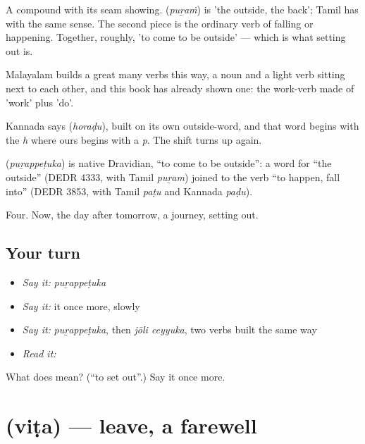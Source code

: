 A compound with its seam showing.  (\emph{puṟaṁ}) is 'the outside, the back'; Tamil has  with the same sense. The second piece is the ordinary verb of falling or happening. Together, roughly, 'to come to be outside' — which is what setting out is.

Malayalam builds a great many verbs this way, a noun and a light verb sitting next to each other, and this book has already shown one: the work-verb made of 'work' plus 'do'.

Kannada says  (\emph{horaḍu}), built on its own outside-word, and that word begins with the \emph{h} where ours begins with a \emph{p}. The shift turns up again.

\begin{cousinweb}
\textbf{} (\emph{puṟappeṭuka}) is native Dravidian, \textquotedblleft{}to come to be outside\textquotedblright{}: a word for \textquotedblleft{}the outside\textquotedblright{} (DEDR 4333, with Tamil \emph{puṟam}) joined to the verb \textquotedblleft{}to happen, fall into\textquotedblright{} (DEDR 3853, with Tamil \emph{paṭu} and Kannada \emph{paḍu}).
\end{cousinweb}

\begin{grammarlens}[title={What you've built}]
Four. Now, the day after tomorrow, a journey, setting out.
\end{grammarlens}

\subsection*{Your turn}
\begin{itemize}
\raggedright
  \item \emph{Say it:} \emph{puṟappeṭuka}
  \item \emph{Say it:} it once more, slowly
  \item \emph{Say it:} \emph{puṟappeṭuka}, then \emph{jōli ceyyuka}, two verbs built the same way
  \item \emph{Read it:} \textbf{}
\end{itemize}

\begin{tcolorbox}[breakable,colback=teal!4,colframe=teal!35!black,title={Before you move on}]
What does  mean? (\textquotedblleft{}to set out\textquotedblright{}.) Say it once more.
\end{tcolorbox}
\section[\texorpdfstring{\ml{വിട} (viṭa)}{വിട (viṭa)}]{ (viṭa) — leave, a farewell}

